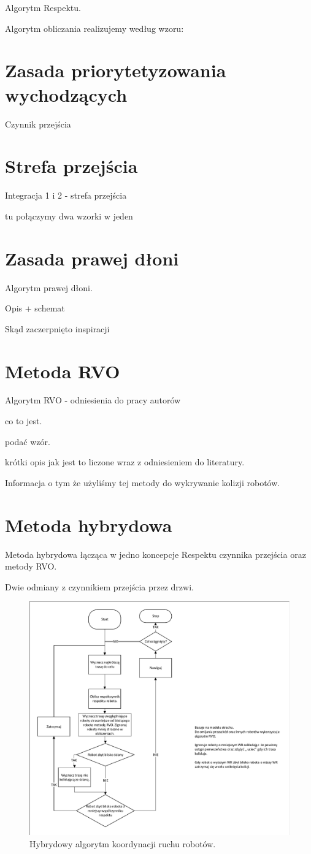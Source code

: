 Algorytm Respektu.

Algorytm obliczania realizujemy według wzoru: 




\section{Zasada priorytetyzowania wychodzących}

Czynnik przejścia



\section{Strefa przejścia}

Integracja 1 i 2 - strefa przejścia 


tu połączymy dwa wzorki w jeden 





\section{Zasada prawej dłoni}

Algorytm prawej dłoni.

Opis + schemat 

Skąd zaczerpnięto inspiracji

\section{Metoda RVO}

Algorytm RVO - odniesienia do pracy autorów

co to jest.

podać wzór.

krótki opis jak jest to liczone wraz z odniesieniem do literatury.

Informacja o tym że użyliśmy tej metody do wykrywanie kolizji robotów.

\section{Metoda hybrydowa}

Metoda hybrydowa łącząca w jedno koncepcje Respektu czynnika przejścia oraz metody RVO.


Dwie odmiany z czynnikiem przejścia przez drzwi.

\begin{figure}[h]
	\centering
	\includegraphics[width=0.45\columnwidth]{img/FearOrginalny.pdf}
	\caption{Hybrydowy algorytm koordynacji ruchu robotów.}
	\label{fig:FearOrginalny}
\end{figure} 

